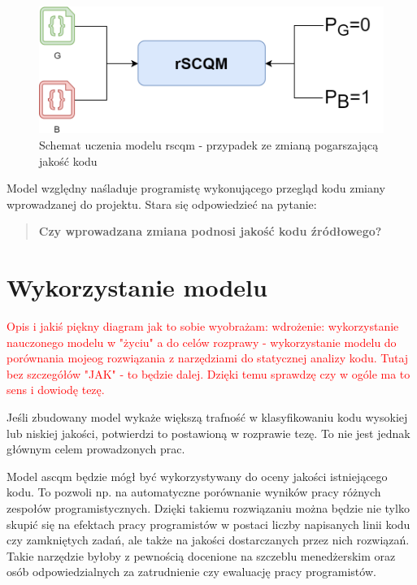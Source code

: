 \documentclass[12pt]{report}
\begin{document}
\begin{figure}
\centering
\includegraphics[width=\textwidth]{proj/rscqm-gb.png}
\caption{Schemat uczenia modelu \gls{rscqm} - przypadek ze zmianą pogarszającą jakość kodu}
\label{fig:proj:rscqm-gb}
\end{figure}

Model względny naśladuje programistę wykonującego przegląd kodu zmiany wprowadzanej do projektu. Stara się odpowiedzieć na pytanie:

\begin{quote}
\textbf{Czy wprowadzana zmiana podnosi jakość kodu źródłowego?}
\end{quote}

\section{Wykorzystanie modelu}
\textcolor{red}{Opis i jakiś piękny diagram jak to sobie wyobrażam:  wdrożenie: wykorzystanie nauczonego modelu w "życiu" a do celów rozprawy - wykorzystanie modelu do porównania mojeog rozwiązania z narzędziami do statycznej analizy kodu. Tutaj bez szczegółów "JAK" - to będzie dalej. Dzięki temu sprawdzę czy w ogóle ma to sens i dowiodę tezę.}

Jeśli zbudowany model wykaże większą trafność w klasyfikowaniu kodu wysokiej lub niskiej jakości, potwierdzi to postawioną w rozprawie tezę. To nie jest jednak głównym celem prowadzonych prac.

Model \gls{ascqm} będzie mógł być wykorzystywany do oceny jakości istniejącego kodu. To pozwoli np. na automatyczne porównanie wyników pracy różnych zespołów programistycznych. Dzięki takiemu rozwiązaniu można będzie nie tylko skupić się na efektach pracy programistów w postaci liczby napisanych linii kodu czy zamkniętych zadań, ale także na jakości dostarczanych przez nich rozwiązań. Takie narzędzie byłoby z pewnością docenione na szczeblu menedżerskim oraz osób odpowiedzialnych za zatrudnienie czy ewaluację pracy programistów.
\end{document}
